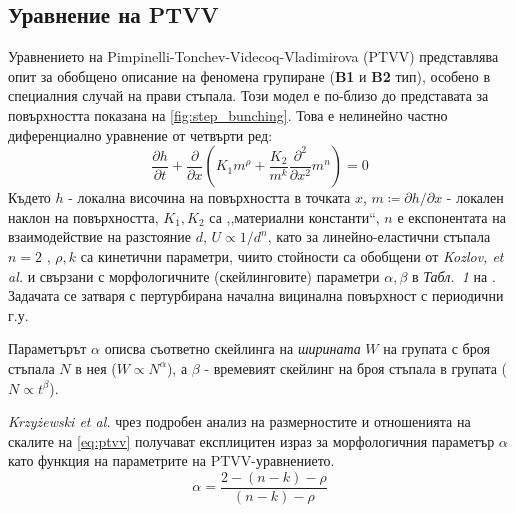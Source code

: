 \subsection{Уравнение на PTVV}
\label{par:ptvv}
Уравнението на Pimpinelli-Tonchev-Videcoq-Vladimirova (PTVV) \cite{Pimpinelli2002} \cite{2Krug2005} представлява опит за обобщено описание на феномена групиране (\textbf{B1} и \textbf{B2} тип), особено в специалния случай на прави стъпала. Този модел е по-близо до представата за повърхността показана на \autoref{fig:step_bunching}. Това е нелинейно частно диференциално уравнение от четвърти ред:
\begin{equation}
    \frac{\partial h}{\partial t} + \frac{\partial }{\partial x} \left( K_{1} m^{\rho} + \frac{K_2}{m^k} \frac{\partial^2 }{\partial x^2} m ^ n \right) = 0
    \label{eq:ptvv}
\end{equation}
Където $h$ - локална височина на повърхността в точката $x$, $m \coloneqq \partial h / \partial x$ - локален наклон на повърхността, $K_1, K_2$ са ,,материални константи``, $n$ е експонентата на взаимодействие на разстояние $d$, $U \propto 1/d^n$, като за линейно-еластични стъпала $n = 2$ \cite{Kozlov2022}, $\rho, k$ са кинетични параметри, чиито стойности са обобщени от \textit{Kozlov, et al.} и свързани с морфологичните (скейлинговите) параметри $\alpha, \beta$ в \textit{Табл.~1} на \cite{Kozlov2022}. Задачата се затваря с пертурбирана начална вицинална повърхност с периодични г.у. 

Параметърът $\alpha$ описва съответно скейлинга на \textit{ширината} $W$ на групата с броя стъпала $N$ в нея ($W \propto N^\alpha$), а $\beta$ - времевият скейлинг на броя стъпала в групата ($N \propto t^\beta$).

\textit{Krzyżewski et al.} чрез подробен анализ на размерностите и отношенията на скалите на \autoref{eq:ptvv} \cite{Krzyewski2018} получават експлицитен израз за морфологичния параметър $\alpha$ като функция на параметрите на PTVV-уравнението.
\begin{equation}
    \alpha = \frac{2 - (n-k) - \rho}{(n-k) - \rho}
    \label{eq:alpha_ptvv}
\end{equation}

